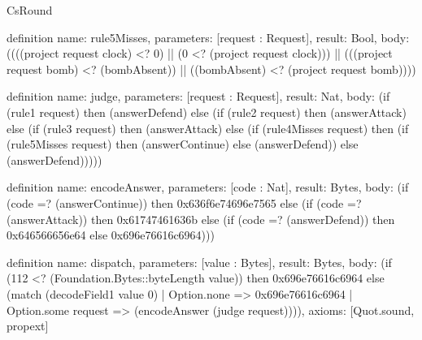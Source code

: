 \begin{lexlean}{CsRound}
\begin{semanticmodule}
definition{
  name: rule5Misses,
  parameters: [request : Request],
  result: Bool,
  body: ((((project request clock) <? 0) || (0 <? (project request clock))) || (((project request bomb) <? (bombAbsent)) || ((bombAbsent) <? (project request bomb))))
}

definition{
  name: judge,
  parameters: [request : Request],
  result: Nat,
  body: (if (rule1 request) then (answerDefend) else (if (rule2 request) then (answerAttack) else (if (rule3 request) then (answerAttack) else (if (rule4Misses request) then (if (rule5Misses request) then (answerContinue) else (answerDefend)) else (answerDefend)))))
}

definition{
  name: encodeAnswer,
  parameters: [code : Nat],
  result: Bytes,
  body: (if (code =? (answerContinue)) then 0x636f6e74696e7565 else (if (code =? (answerAttack)) then 0x61747461636b else (if (code =? (answerDefend)) then 0x646566656e64 else 0x696e76616c6964)))
}

definition{
  name: dispatch,
  parameters: [value : Bytes],
  result: Bytes,
  body: (if (112 <? (Foundation.Bytes::byteLength value)) then 0x696e76616c6964 else (match (decodeField1 value 0)
    | Option.none => 0x696e76616c6964
    | Option.some request => (encodeAnswer (judge request)))),
  axioms: [Quot.sound, propext]
}


\end{semanticmodule}
\end{lexlean}
